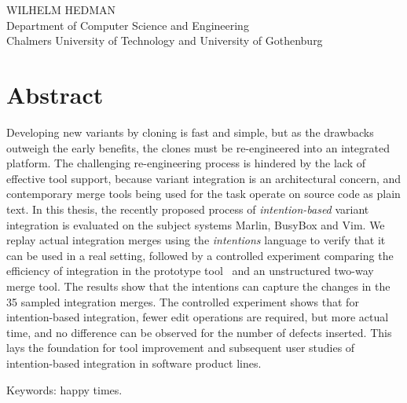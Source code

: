 \fullt\\
\subt\\
WILHELM HEDMAN\\
Department of Computer Science and Engineering\\
Chalmers University of Technology and University of Gothenburg\setlength{\parskip}{0.5cm}

\thispagestyle{plain}			%
\setlength{\parskip}{0pt plus 1.0pt}
\section*{Abstract}
Developing new variants by cloning is fast and simple, but as the drawbacks outweigh the early benefits, the clones must be re-engineered into an integrated platform. The challenging re-engineering process is hindered by the lack of effective tool support, because variant integration is an architectural concern, and contemporary merge tools being used for the task operate on source code as plain text. In this thesis, the recently proposed process of \textit{intention-based} variant integration is evaluated on the subject systems Marlin, BusyBox and Vim. We replay actual integration merges using the \textit{intentions} language to verify that it can be used in a real setting, followed by a controlled experiment comparing the efficiency of integration in the prototype tool \tooln~and an unstructured two-way merge tool. The results show that the intentions can capture the changes in the 35 sampled integration merges. The controlled experiment shows that for intention-based integration, fewer edit operations are required, but more actual time, and no difference can be observed for the number of defects inserted. This lays the foundation for tool improvement and subsequent user studies of intention-based integration in software product lines.


\vfill
Keywords: happy times.

\newpage				%
\thispagestyle{empty}
\mbox{}